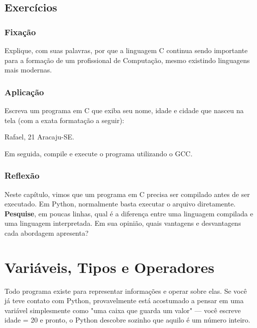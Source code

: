 \documentclass[12pt,a4paper,oneside]{extreport}
\begin{document}
\section*{Exercícios}

\begin{exercicio}

\subsection*{Fixação} 
Explique, com suas palavras, por que a linguagem C continua sendo importante para a formação de um profissional de Computação, mesmo existindo linguagens mais modernas. \newline

\subsection*{Aplicação} 
Escreva um programa em C que exiba seu nome, idade e cidade que nasceu na tela (com a exata formatação a seguir):

\begin{terminal}
Rafael, 21
Aracaju-SE.
\end{terminal}

Em seguida, compile e execute o programa utilizando o GCC.

\subsection*{Reflexão} 
Neste capítulo, vimos que um programa em C precisa ser compilado antes de ser executado. Em Python, normalmente basta executar o arquivo diretamente.
\textbf{Pesquise}, em poucas linhas, qual é a diferença entre uma linguagem compilada e uma linguagem interpretada. Em sua opinião, quais vantagens e desvantagens cada abordagem apresenta?
    
\end{exercicio}

    



\chapter{Variáveis, Tipos e Operadores}

Todo programa existe para representar informações e operar sobre elas. Se você já teve contato com Python, provavelmente está acostumado a pensar em uma variável simplesmente como "uma caixa que guarda um valor" — você escreve idade = 20 e pronto, o Python descobre sozinho que aquilo é um número inteiro.
\end{document}
